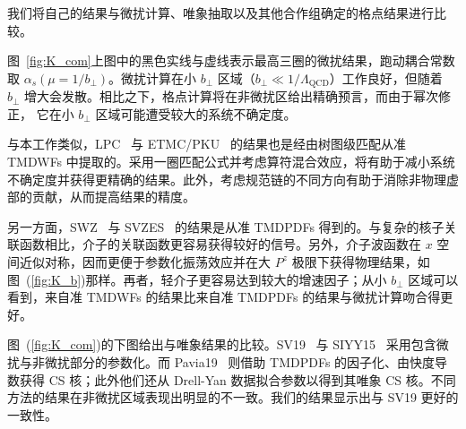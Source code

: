我们将自己的结果与微扰计算、唯象抽取以及其他合作组确定的格点结果进行比较。

图~\ref{fig:K_com}上图中的黑色实线与虚线表示最高三圈的微扰结果，跑动耦合常数取 $\alpha_s(\mu=1/b_{\perp})$。微扰计算在小 $b_{\perp}$ 区域（$b_{\perp}\ll1/\Lambda_{\mathrm{QCD}}$）工作良好，但随着 $b_{\perp}$ 增大会发散。相比之下，格点计算将在非微扰区给出精确预言，而由于幂次修正，
它在小 $b_{\perp}$ 区域可能遭受较大的系统不确定度。

与本工作类似，LPC~\cite{LatticeParton:2020uhz} 与 ETMC/PKU~\cite{Li:2021wvl} 的结果也是经由树图级匹配从准 TMDWFs 中提取的。采用一圈匹配公式并考虑算符混合效应，将有助于减小系统不确定度并获得更精确的结果。此外，考虑规范链的不同方向有助于消除非物理虚部的贡献，从而提高结果的精度。

另一方面，SWZ~\cite{Shanahan:2021tst} 与 SVZES~\cite{Schlemmer:2021aij} 的结果是从准 TMDPDFs 得到的。与复杂的核子关联函数相比，介子的关联函数更容易获得较好的信号。另外，介子波函数在 $x$ 空间近似对称，因而更便于参数化振荡效应并在大 $P^z$ 极限下获得物理结果，如图~(\ref{fig:K_b})那样。再者，轻介子更容易达到较大的增速因子；从小 $b_{\perp}$ 区域可以看到，来自准 TMDWFs 的结果比来自准 TMDPDFs 的结果与微扰计算吻合得更好。

图~(\ref{fig:K_com})的下图给出与唯象结果的比较。SV19~\cite{Scimemi:2019cmh} 与 SIYY15~\cite{Sun:2014dqm} 采用包含微扰与非微扰部分的参数化。而 Pavia19~\cite{Bacchetta:2019sam} 则借助 TMDPDFs 的因子化、由快度导数获得 CS 核；此外他们还从 Drell-Yan 数据拟合参数以得到其唯象 CS 核。不同方法的结果在非微扰区域表现出明显的不一致。我们的结果显示出与 SV19 更好的一致性。
